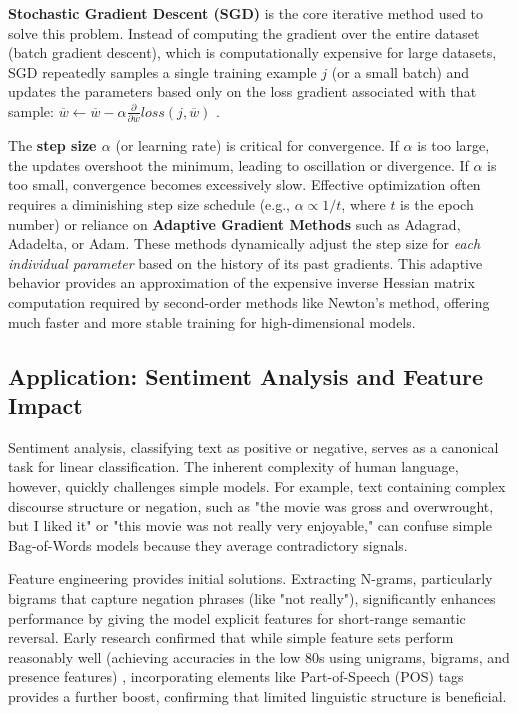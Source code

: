 \documentclass{article}
\begin{document}
\textbf{Stochastic Gradient Descent (SGD)} is the core iterative method used to solve this problem. Instead of computing the gradient over the entire dataset (batch gradient descent), which is computationally expensive for large datasets, SGD repeatedly samples a single training example $j$ (or a small batch) and updates the parameters based only on the loss gradient associated with that sample: $\overline{w} \leftarrow \overline{w} - \alpha \frac{\partial}{\partial\overline{w}} loss(j,\overline{w})$ .

The \textbf{step size $\alpha$} (or learning rate) is critical for convergence. If $\alpha$ is too large, the updates overshoot the minimum, leading to oscillation or divergence. If $\alpha$ is too small, convergence becomes excessively slow. Effective optimization often requires a diminishing step size schedule (e.g., $\alpha \propto 1/t$, where $t$ is the epoch number) or reliance on \textbf{Adaptive Gradient Methods} such as Adagrad, Adadelta, or Adam. These methods dynamically adjust the step size for \textit{each individual parameter} based on the history of its past gradients. This adaptive behavior provides an approximation of the expensive inverse Hessian matrix computation required by second-order methods like Newton's method, offering much faster and more stable training for high-dimensional models.

\subsection{Application: Sentiment Analysis and Feature Impact}

Sentiment analysis, classifying text as positive or negative, serves as a canonical task for linear classification. The inherent complexity of human language, however, quickly challenges simple models. For example, text containing complex discourse structure or negation, such as "the movie was gross and overwrought, but I liked it" or "this movie was not really very enjoyable," can confuse simple Bag-of-Words models because they average contradictory signals.

Feature engineering provides initial solutions. Extracting N-grams, particularly bigrams that capture negation phrases (like "not really"), significantly enhances performance by giving the model explicit features for short-range semantic reversal. Early research confirmed that while simple feature sets perform reasonably well (achieving accuracies in the low 80s using unigrams, bigrams, and presence features) , incorporating elements like Part-of-Speech (POS) tags provides a further boost, confirming that limited linguistic structure is beneficial.
\end{document}
